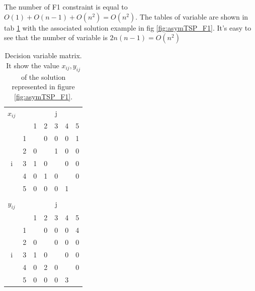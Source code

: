 The number of F1 constraint is equal to $ O(1) + O(n-1) + O(n^2) = O(n^2) $. The tables of variable are shown in tab \ref{tab:asymTSP_F1_solution} with the associated solution example in fig \ref{fig:asymTSP_F1}. It's easy to see that the number of variable is $ 2n(n-1) = O(n^2) $\\


\begin{table}[h!]
	\begin{center}
		\caption{Decision variable matrix. It show the value $ x_{ij}, y_{ij} $ of the solution represented in figure \ref{fig:asymTSP_F1}.}
		\label{tab:asymTSP_F1_solution}
		\begin{tabular}{cc|c|c|c|c|c|}
			
$ x_{ij} $ & \multicolumn{1}{c}{} & \multicolumn{5}{c}{j} \\ %
& \multicolumn{1}{c}{} & \multicolumn{1}{c}{1} & \multicolumn{1}{c}{2} & \multicolumn{1}{c}{3} & \multicolumn{1}{c}{4} & \multicolumn{1}{c}{5} \\ \cline{3-7}
\multirow{5}{*}{i} 	& 1 & \cellcolor{Black} & 0 & 0 & 0 & 1 \\ \cline{3-7}
& 2 & 0 & \cellcolor{Black} & 1 & 0 & 0 \\ \cline{3-7}
& 3 & 1 & 0 & \cellcolor{Black} & 0 & 0 \\ \cline{3-7}
& 4 & 0 & 1 & 0 & \cellcolor{Black} & 0 \\ \cline{3-7}
& 5 & 0 & 0 & 0 & 1 & \cellcolor{Black} \\ \cline{3-7}
\multicolumn{7}{c}{} \\ 

$ y_{ij} $ & \multicolumn{1}{c}{} & \multicolumn{5}{c}{j} \\ %
& \multicolumn{1}{c}{} & \multicolumn{1}{c}{1} & \multicolumn{1}{c}{2} & \multicolumn{1}{c}{3} & \multicolumn{1}{c}{4} & \multicolumn{1}{c}{5} \\ \cline{3-7}
\multirow{5}{*}{i} 	& 1 & \cellcolor{Black} & 0 & 0 & 0 & 4 \\ \cline{3-7}
					& 2 & 0 & \cellcolor{Black} & 0 & 0 & 0 \\ \cline{3-7}
					& 3 & 1 & 0 & \cellcolor{Black} & 0 & 0 \\ \cline{3-7}
					& 4 & 0 & 2 & 0 & \cellcolor{Black} & 0 \\ \cline{3-7}
					& 5 & 0 & 0 & 0 & 3 & \cellcolor{Black} \\ \cline{3-7}
			
		\end{tabular}
	\end{center}
\end{table}